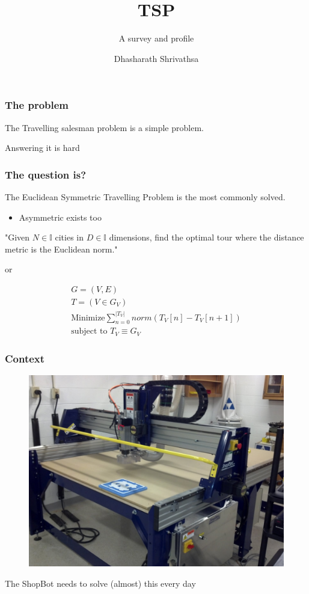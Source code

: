 \documentclass[11pt]{beamer}
\begin{document}
	\author{Dhasharath Shrivathsa}
	\title{TSP}
	\subtitle{A survey and profile}
	\frame[plain]{\maketitle}
	
	\begin{frame}
		\frametitle{The problem}
		\centering
		The Travelling salesman problem is a simple problem.
		
		Answering it is hard
	\end{frame}
	\begin{frame}
		\frametitle{The question is?}
		\centering
		The Euclidean Symmetric Travelling Problem is the most commonly solved.
		\small
		\begin{itemize}
			\item Asymmetric exists too
		\end{itemize}
	
		"Given $N \in \mathbb{I}$ cities in $D \in \mathbb{I}$ dimensions, find the optimal tour where the distance metric is the Euclidean norm."
	
		or
		
		\begin{align}
			G = (V, E)\nonumber\\ T = (V \in G_V)\nonumber\\
			\text{Minimize} \sum_{n=0}^{|T_V|} norm(T_V[n]-T_V[n+1])\\
			\text{subject to } T_V \equiv G_V
		\end{align}		
	\end{frame}
	\begin{frame}
		\frametitle{Context}
		\centering
		\begin{figure}
			\centering
			\includegraphics[width=0.7\linewidth]{img/ShopBot}
		\end{figure}
		The ShopBot needs to solve (almost) this every day
	\end{frame}
\end{document}
